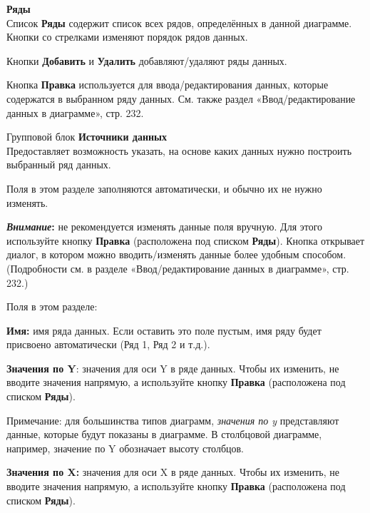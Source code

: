 ﻿\documentclass[a4paper,10pt]{article}
\newenvironment{myindentpar}[1]%
 {\begin{list}{}%
         {\setlength{\leftmargin}{#1}}%
         \item[]%
 }
 {\end{list}}
\begin{document}
\begin{itemize}
 \item \textbf{Ряды}\\
 Список \textbf{Ряды} содержит список всех рядов, определённых в данной диаграмме.\\
 Кнопки со стрелками изменяют порядок рядов данных.
 
 Кнопки \textbf{Добавить} и \textbf{Удалить} добавляют/удаляют ряды данных.
 
 Кнопка \textbf{Правка} используется для ввода/редактирования данных, которые содержатся в выбранном ряду данных. См. также раздел «Ввод/редактирование данных в диаграмме», стр. 232.
 \item Групповой блок \textbf{Источники данных}\\
 Предоставляет возможность указать, на основе каких данных нужно построить выбранный ряд данных.
 
 Поля в этом разделе заполняются автоматически, и обычно их не нужно изменять.
 
 \begin{mdframed}[backgroundcolor=blue!10]
\textbf{\textit{Внимание}:} не рекомендуется изменять данные поля вручную. Для этого используйте кнопку \textbf{Правка} (расположена под списком \textbf{Ряды}). Кнопка открывает диалог, в котором можно вводить/изменять данные более удобным способом. (Подробности см. в разделе «Ввод/редактирование данных в диаграмме», стр. 232.)
\end{mdframed}

Поля в этом разделе:

\textbf{Имя:} имя ряда данных. Если оставить это поле пустым, имя ряду будет присвоено автоматически (Ряд 1, Ряд 2 и т.д.).

\textbf{Значения по Y}: значения для оси Y в ряде данных. Чтобы их изменить, не вводите значения напрямую, а используйте кнопку \textbf{Правка} (расположена под списком \textbf{Ряды}).

\begin{myindentpar}{1cm}
 Примечание: для большинства типов диаграмм, \textit{значения по y} представляют данные, которые будут показаны в диаграмме. В столбцовой диаграмме, например, значение по Y обозначает высоту столбцов.
\end{myindentpar}

\textbf{Значения по X:} значения для оси X в ряде данных. Чтобы их изменить, не вводите значения напрямую, а используйте кнопку \textbf{Правка} (расположена под списком \textbf{Ряды}).


\end{itemize}
\end{document}
